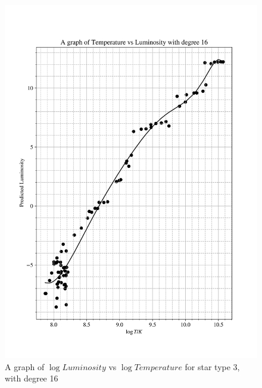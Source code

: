 \documentclass[12pt, a4paper]{article}
\begin{document}
\begin{figure}[H]
    \centering
    \includegraphics[width = \textwidth]{2Plot4_16.png}
    \caption{A graph of \(\log{Luminosity}\) vs \(\log{Temperature}\) for star type 3, with degree 16}
    \label{fig:Fig 2.7}
\end{figure}
\end{document}
